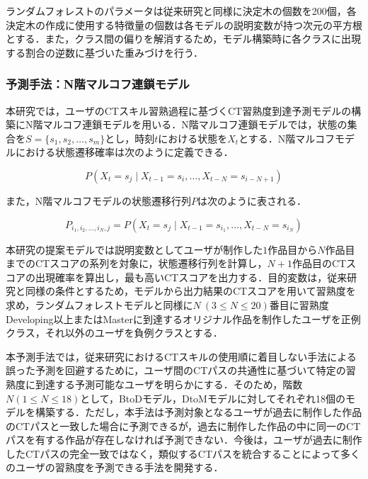 \documentclass[submit]{ipsj}
\begin{document}

ランダムフォレストのパラメータは従来研究と同様に決定木の個数を200個，各決定木の作成に使用する特徴量の個数は各モデルの説明変数が持つ次元の平方根とする．また，クラス間の偏りを解消するため，モデル構築時に各クラスに出現する割合の逆数に基づいた重みづけを行う．



\subsubsection{予測手法：N階マルコフ連鎖モデル}\label{sec:marcov-approach}

本研究では，ユーザのCTスキル習熟過程に基づくCT習熟度到達予測モデルの構築にN階マルコフ連鎖モデルを用いる．N階マルコフ連鎖モデルでは，状態の集合を$S=\{s_1,s_2,\ldots,s_m\}$とし，時刻$t$における状態を$X_t$とする．N階マルコフモデルにおける状態遷移確率は次のように定義できる．

\begin{equation}
P(X_t=s_j\mid X_{t-1}=s_i,\ldots,X_{t-N}=s_{i-N+1})
\end{equation}

また，N階マルコフモデルの状態遷移行列$P$は次のように表される．

\begin{equation}
P_{i_1,i_2,\ldots,i_N,j}=P(X_t=s_j \mid X_{t-1} = s_{i_1}, \ldots, X_{t-N} = s_{i_N})
\end{equation}

本研究の提案モデルでは説明変数としてユーザが制作した$1$作品目から$N$作品目までのCTスコアの系列を対象に，状態遷移行列を計算し，$N+1$作品目のCTスコアの出現確率を算出し，最も高いCTスコアを出力する．目的変数は，従来研究と同様の条件とするため，モデルから出力結果のCTスコアを用いて習熟度を求め，ランダムフォレストモデルと同様に{$N~(3 \leq N \leq 20)$}番目に習熟度Developing以上またはMasterに到達するオリジナル作品を制作したユーザを正例クラス，それ以外のユーザを負例クラスとする．

本予測手法では，従来研究におけるCTスキルの使用順に着目しない手法による誤った予測を回避するために，ユーザ間のCTパスの共通性に基づいて特定の習熟度に到達する予測可能なユーザを明らかにする．そのため，階数$N(1\leq N \leq 18)$として，BtoDモデル，DtoMモデルに対してそれぞれ18個のモデルを構築する．ただし，本手法は予測対象となるユーザが過去に制作した作品のCTパスと一致した場合に予測できるが，過去に制作した作品の中に同一のCTパスを有する作品が存在しなければ予測できない．今後は，ユーザが過去に制作したCTパスの完全一致ではなく，類似するCTパスを統合することによって多くのユーザの習熟度を予測できる手法を開発する．
\end{document}

